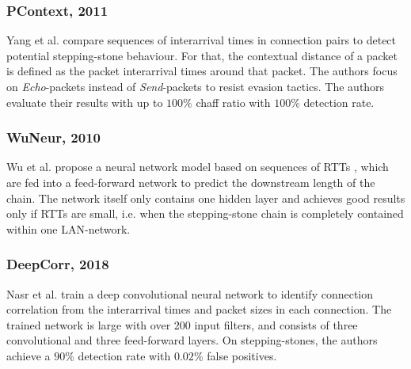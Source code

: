 
\subsubsection{PContext, 2011}

Yang et al. \cite{yang2011correlating} compare sequences of interarrival times in connection pairs to detect potential stepping-stone behaviour. For that, the contextual distance of a packet is defined as the packet interarrival times around that packet. %
The authors focus on \textit{Echo}-packets instead of \textit{Send}-packets to resist evasion tactics.%
The authors evaluate their results with up to $100\%$ chaff ratio with $100\%$ detection rate.





\subsubsection{WuNeur, 2010}

Wu et al. \cite{wu2010neural} propose a neural network model based on sequences of RTTs
, which are fed into a feed-forward network to predict the downstream length of the chain. The network itself only contains one hidden layer and achieves good results only if RTTs are small, i.e. when the stepping-stone chain is completely contained within one LAN-network.

\subsubsection{DeepCorr, 2018}

Nasr et al. \cite{nasr2018deepcorr} train a deep convolutional neural network to identify connection correlation from the interarrival times and packet sizes in each connection. The trained network is large with over 200 input filters, and consists of three convolutional and three feed-forward layers.
On stepping-stones, the authors achieve a $90\%$ detection rate with $0.02 \%$ false positives. 

